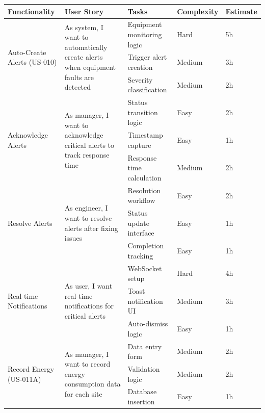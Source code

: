\begin{table}[H]
\centering
\small
\begin{tabular}{|p{2.5cm}|p{4cm}|p{3.2cm}|p{2.2cm}|p{1.5cm}|}
\hline
\textbf{Functionality} & \textbf{User Story} & \textbf{Tasks} & \textbf{Complexity} & \textbf{Estimate} \\
\hline

\multirow{3}{2.5cm}{Auto-Create Alerts (US-010)} & 
\multirow{3}{4cm}{As system, I want to automatically create alerts when equipment faults are detected}
& Equipment monitoring logic & Hard & 5h \\
\cline{3-5}
& & Trigger alert creation & Medium & 3h \\
\cline{3-5}
& & Severity classification & Medium & 2h \\
\hline

\multirow{3}{2.5cm}{Acknowledge Alerts} & 
\multirow{3}{4cm}{As manager, I want to acknowledge critical alerts to track response time}
& Status transition logic & Easy & 2h \\
\cline{3-5}
& & Timestamp capture & Easy & 1h \\
\cline{3-5}
& & Response time calculation & Medium & 2h \\
\hline

\multirow{3}{2.5cm}{Resolve Alerts} & 
\multirow{3}{4cm}{As engineer, I want to resolve alerts after fixing issues}
& Resolution workflow & Easy & 2h \\
\cline{3-5}
& & Status update interface & Easy & 1h \\
\cline{3-5}
& & Completion tracking & Easy & 1h \\
\hline

\multirow{3}{2.5cm}{Real-time Notifications} & 
\multirow{3}{4cm}{As user, I want real-time notifications for critical alerts}
& WebSocket setup & Hard & 4h \\
\cline{3-5}
& & Toast notification UI & Medium & 3h \\
\cline{3-5}
& & Auto-dismiss logic & Easy & 1h \\
\hline

\multirow{3}{2.5cm}{Record Energy (US-011A)} & 
\multirow{3}{4cm}{As manager, I want to record energy consumption data for each site}
& Data entry form & Medium & 2h \\
\cline{3-5}
& & Validation logic & Medium & 2h \\
\cline{3-5}
& & Database insertion & Easy & 1h \\
\hline


\end{tabular}
\end{table}
